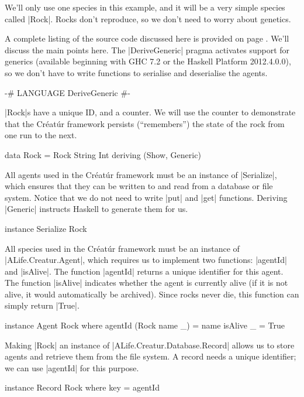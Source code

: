 We'll only use one species in this example, and it will be a very simple 
species called |Rock|.
Rocks don't reproduce, so we don't need to worry about genetics.

A complete listing of the source code discussed here is provided on 
page \pageref{code:rock}.
We'll discuss the main points here.
The |DeriveGeneric| pragma activates support for generics
(available beginning with GHC 7.2 or the Haskell Platform 2012.4.0.0),
so we don't have to write functions to serialise and deserialise
the agents.

\begin{code}
{-# LANGUAGE DeriveGeneric #-}
\end{code} 

|Rock|s have a unique ID, and a counter. 
We will use the counter to demonstrate that the Créatúr
framework persists (``remembers'') the state of the rock
from one run to the next.

\begin{code}
data Rock = Rock String Int deriving (Show, Generic)
\end{code} 

All agents used in the Créatúr framework must be an instance of
|Serialize|, which ensures that they can be written to and read from a
database or file system.
Notice that we do not need to write |put| and |get| functions.
Deriving |Generic| instructs Haskell to generate them for us.

\begin{code}
instance Serialize Rock
\end{code} 

All species used in the Créatúr framework must be an instance of 
|ALife.Creatur.Agent|,
which requires us to implement two functions: |agentId| and |isAlive|.
The function |agentId| returns a unique identifier for this agent.
The function |isAlive| indicates whether the agent is currently alive
(if it is not alive, it would automatically be archived).
Since rocks never die, this function can simply return |True|.

\begin{code}
instance Agent Rock where
  agentId (Rock name _) = name
  isAlive _ = True
\end{code} 

Making |Rock| an instance of |ALife.Creatur.Database.Record|
allows us to store agents and retrieve them from the file system.
A record needs a unique identifier;
we can use |agentId| for this purpose.

\begin{code}
instance Record Rock where key = agentId
\end{code} 

